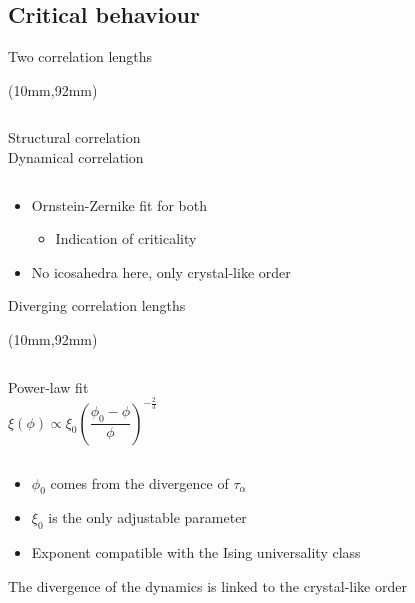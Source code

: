 \subsection{Critical behaviour}

\begin{frame}{Two correlation lengths}
	\begin{textblock*}{0.6\textwidth}(10mm,92mm)
		\simplephasediagram{}
	\end{textblock*}
	\begin{columns}[T]
	\centering
	Structural correlation\\
	\resizebox{\columnwidth}{!}{\begin{Large}\end{Large}}
	\centering
	Dynamical correlation\\
	\resizebox{\columnwidth}{!}{\begin{Large}\end{Large}}	
	\end{columns}
	\begin{itemize}
		\item Ornstein-Zernike fit for both
		\begin{itemize}
			\item Indication of criticality
		\end{itemize}
		\item No icosahedra here, only crystal-like order
	\end{itemize}
\end{frame}

\begin{frame}{Diverging correlation lengths}
	\begin{textblock*}{0.6\textwidth}(10mm,92mm)
		\simplephasediagram{}
	\end{textblock*}
	\begin{columns}
	\centering
	\resizebox{\columnwidth}{!}{\begin{Large}\end{Large}}
	\centering
	Power-law fit
	\[ \xi(\phi) \propto \xi_0 \left( \frac{\phi_0 - \phi}{\phi} \right)^{-\frac{2}{3}} \]
	\end{columns}
	\begin{itemize}
		\item $\phi_0$ comes from the divergence of $\tau_\alpha$
		\item $\xi_0$ is the only adjustable parameter
		\item Exponent compatible with the Ising universality class
	\end{itemize}
	The divergence of the dynamics is linked to the crystal-like order
\end{frame}

